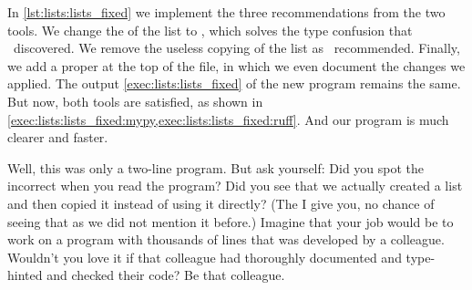 %
%
%
%
In \cref{lst:lists:lists_fixed} we implement the three recommendations from the two tools.
We change the  of the list to , which solves the type confusion that \mypy\ discovered.
We remove the useless copying of the list as \ruff\ recommended.
Finally, we add a proper  at the top of the file, in which we even document the changes we applied.
The output \cref{exec:lists:lists_fixed} of the new program remains the same.
But now, both tools are satisfied, as shown in \cref{exec:lists:lists_fixed:mypy,exec:lists:lists_fixed:ruff}.
And our program is much clearer and faster.%
%
%
%
\FloatBarrier%
%
%
%
%
%

Well, this was only a two-line program.
But ask yourself:
Did you spot the incorrect  when you read the program?
Did you see that we actually created a list and then copied it instead of using it directly?
(The  I give you, no chance of seeing that as we did not mention it before.)
Imagine that your job would be to work on a program with thousands of lines that was developed by a colleague.
Wouldn't you love it if that colleague had thoroughly documented and type-hinted and checked their code?
Be that colleague.%
%
\FloatBarrier%
\endhsection%
\endhsection%
%
